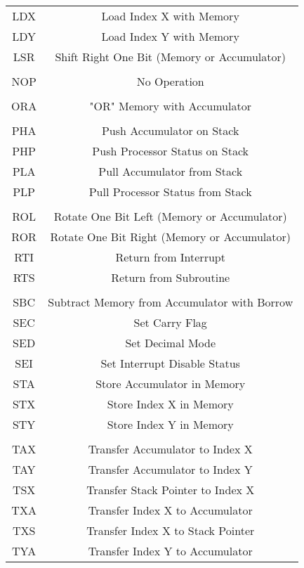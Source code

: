 \documentclass{article}
\begin{document}
\begin{longtable}{|c c|}
  LDX & Load Index X with Memory \\
  LDY & Load Index Y with Memory \\
  LSR & Shift Right One Bit (Memory or Accumulator) \\
      & \\
  NOP & No Operation \\
      & \\
  ORA & "OR" Memory with Accumulator \\
      & \\
  PHA & Push Accumulator on Stack \\
  PHP & Push Processor Status on Stack \\
  PLA & Pull Accumulator from Stack \\
  PLP & Pull Processor Status from Stack \\
      & \\
  ROL & Rotate One Bit Left (Memory or Accumulator) \\
  ROR & Rotate One Bit Right (Memory or Accumulator) \\
  RTI & Return from Interrupt \\
  RTS & Return from Subroutine \\
      & \\
  SBC & Subtract Memory from Accumulator with Borrow \\
  SEC & Set Carry Flag \\
  SED & Set Decimal Mode \\
  SEI & Set Interrupt Disable Status \\
  STA & Store Accumulator in Memory \\
  STX & Store Index X in Memory \\
  STY & Store Index Y in Memory \\
      & \\
  TAX & Transfer Accumulator to Index X \\
  TAY & Transfer Accumulator to Index Y \\
  TSX & Transfer Stack Pointer to Index X \\
  TXA & Transfer Index X to Accumulator \\
  TXS & Transfer Index X to Stack Pointer \\
  TYA & Transfer Index Y to Accumulator \\ 
  \end{longtable}
\end{document}
